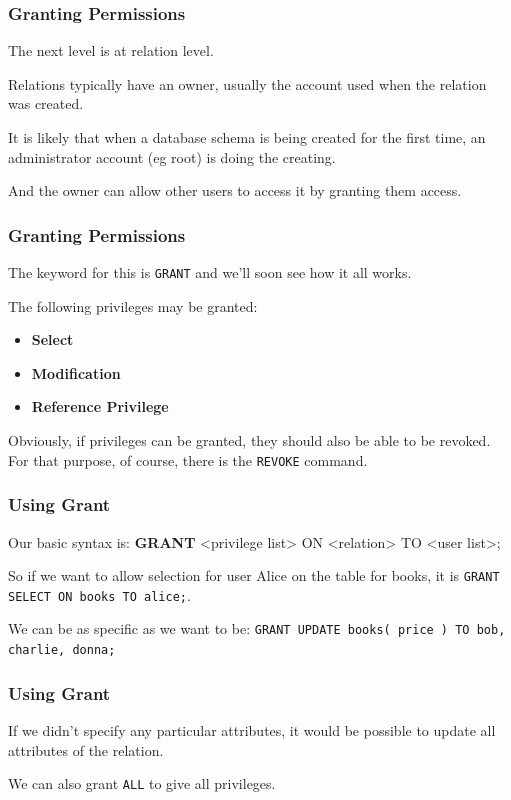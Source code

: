 \begin{frame}
\frametitle{Granting Permissions}

The next level is at relation level. 

Relations typically have an owner, usually the account used when the relation was created. 

It is likely that when a database schema is being created for the first time, an administrator account (eg root) is doing the creating. 

And the owner can allow other users to access it by \alert{granting} them access.


\end{frame}



\begin{frame}
\frametitle{Granting Permissions}

The keyword for this is \texttt{GRANT} and we'll soon see how it all works. 

The following privileges may be granted:

\begin{itemize}
	\item \textbf{Select}
	\item \textbf{Modification}
	\item \textbf{Reference Privilege}
\end{itemize}

Obviously, if privileges can be granted, they should also be able to be revoked. For that purpose, of course, there is the \texttt{REVOKE} command. 

\end{frame}



\begin{frame}
\frametitle{Using Grant}

Our basic syntax is: \textbf{GRANT} <privilege list> ON <relation> TO <user list>; 

So if we want to allow selection for user Alice on the table for books, it is \texttt{GRANT SELECT ON books TO alice;}.

 We can be as specific as we want to be: \texttt{GRANT UPDATE books( price ) TO bob, charlie, donna;} 
 
\end{frame}



\begin{frame}
\frametitle{Using Grant}
 
If we didn't specify any particular attributes, it would be possible to update all attributes of the relation. 

We can also grant \texttt{ALL} to give all privileges. 

\end{frame}




